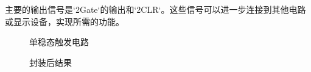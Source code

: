 \documentclass[UTF8,titlepage,a4paper]{ctexart}
\numberwithin{figure}{section}
\begin{document}
\begin{enumerate}
    主要的输出信号是`2Gate`的输出和`2CLR`。这些信号可以进一步连接到其他电路或显示设备，实现所需的功能。
    \begin{figure}[H]
    \centering
     \caption{单稳态触发电路}
     \label{}
    \end{figure}
    \begin{figure}[H]
    \centering
     \caption{封装后结果}
     \label{}
    \end{figure}
\end{enumerate}
\end{document}
